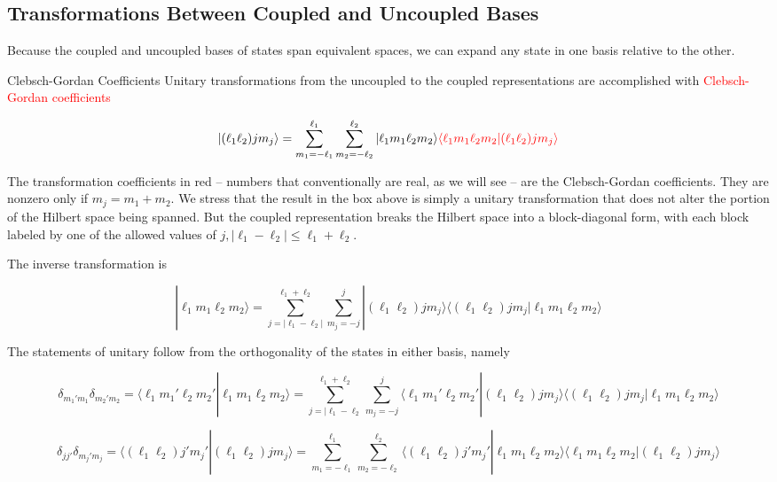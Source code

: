 \subsection{Transformations Between Coupled and Uncoupled Bases}

Because the coupled and uncoupled bases of states span equivalent spaces, we
can expand any state in one basis relative to the other. 

\begin{mainbox}{Clebsch-Gordan Coefficients}
  Unitary transformations from the uncoupled to the coupled representations are
  accomplished with \textcolor{red}{Clebsch-Gordan coefficients} 

  \[ |(\ell_1\ell_2) jm_j \rangle = \sum_{m_1 = -\ell_1}^{\ell_1} \sum_{m_2
    = -\ell_2}^{\ell_2} |\ell_1m_1\ell_2m_2\rangle \textcolor{red}{\langle
  \ell_1m_1\ell_2m_2|(\ell_1\ell_2) jm_j\rangle} \]
\end{mainbox}

The transformation coefficients in red -- numbers that conventionally are
real, as we will see -- are the Clebsch-Gordan coefficients. They are nonzero
only if $m_j = m_1 + m_2$. We stress that the result in the box above is simply
a unitary transformation that does not alter the portion of the Hilbert space
being spanned. But the coupled representation breaks the Hilbert space into
a block-diagonal form, with each block labeled by one of the allowed values of
$j, |\ell_1 - \ell_2| \leq \ell_1+\ell_2$.

The inverse transformation is 

\[
|\ell_1 m_1 \ell_2 m_2\rangle = \sum_{j=|\ell_1 - \ell_2|}^{\ell_1+\ell_2}
\sum_{m_j = -j}^{j} |(\ell_1\ell_2) jm_j \rangle \langle
(\ell_1\ell_2)jm_j|\ell_1m_1\ell_2m_2\rangle 
\] \vspace{3px}

The statements of unitary follow from the orthogonality of the states in either
basis, namely 

\[ \delta_{m_1'm_1} \delta_{m_2'm_2} = \langle \ell_1 m_1' \ell_2m_2'
| \ell_1m_1\ell_2m_2 \rangle = \sum_{j=|\ell_1-\ell_2}^{\ell_1+\ell_2}
\sum_{m_j = -j}^{j} \langle \ell_1m_1' \ell_2m_2' | (\ell_1\ell_2)jm_j \rangle
\langle (\ell_1\ell_2)jm_j | \ell_1 m_1 \ell_2 m_2 \rangle\] 

\[
  \delta_{jj'} \delta_{m_j'm_j} = \langle (\ell_1\ell_2)j'm_j' |(\ell_1\ell_2)
  jm_j \rangle = \sum_{m_1 = -\ell_1}^{\ell_1} \sum_{m_2 = -\ell_2}^{\ell_2}
  \langle (\ell_1\ell_2) j'm_j' | \ell_1m_1\ell_2m_2\rangle \langle
  \ell_1m_1\ell_2m_2 | (\ell_1\ell_2)jm_j \rangle
\] \vspace{3px}

